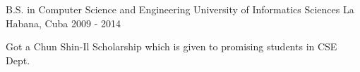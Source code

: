


\begin{cventries}


\cventry
{B.S. in Computer Science and Engineering} %
{University of Informatics Sciences} %
{La Habana, Cuba} %
{2009 - 2014} %
{ %
\begin{cvitems}
\item {Got a Chun Shin-Il Scholarship which is given to promising students in CSE Dept.}
\end{cvitems}
}


\end{cventries}